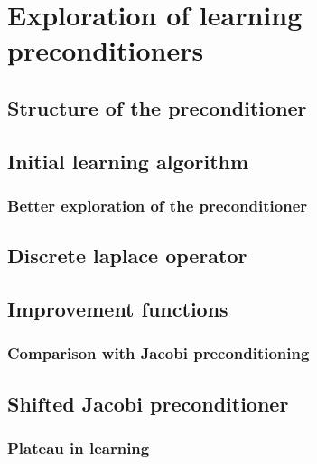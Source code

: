 \section{Exploration of learning preconditioners}
 


\subsection{Structure of the preconditioner}\label{sec: initial par shift}


\subsection{Initial learning algorithm}\label{sec: initial learn}



\subsubsection{Better exploration of the preconditioner}\label{sec: better exploration}



\subsection{Discrete laplace operator}



\subsection{Improvement functions}\label{sec: Improve func}


\subsubsection{Comparison with Jacobi preconditioning}

\newpage
\subsection{Shifted Jacobi preconditioner}\label{sec: jacobi shift}



\subsubsection{Plateau in learning}\label{sec: plateau}



